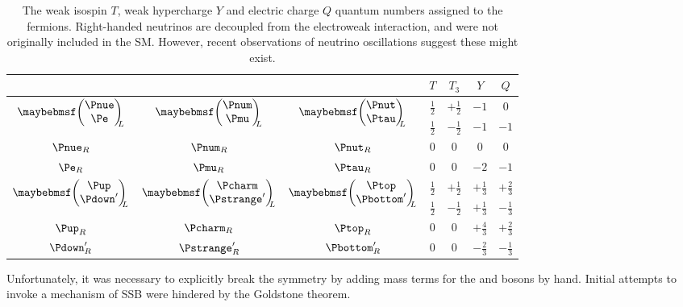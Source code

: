 \begin{table}[b]
	\begin{tabular}{ccc@{\hskip 1cm}cccc}
		& & & $T$ & $T_3$ & $Y$ & $Q$ \\
		\hline
		\multirow{2}{*}{$\colvector{\Pnue\\ \Pe}_{\!\!\!L}$} & 
		\multirow{2}{*}{$\colvector{\Pnum\\ \Pmu}_{\!\!\!L}$} & 
		\multirow{2}{*}{$\colvector{\Pnut\\ \Ptau}_{\!\!\!L}$} & 
		$\tfrac{1}{2}$ & $+\tfrac{1}{2}$ & $-1$ & 0 \\
		& & & $\tfrac{1}{2}$ & $-\tfrac{1}{2}$ & $-1$ & $-1$ \\
		$\Pnue_R$ & $\Pnum_R$ & $\Pnut_R$ & 0 & 0 & 0 & 0 \\
		$\Pe_R$ & $\Pmu_R$ & $\Ptau_R$ & 0 & 0 & $-2$ & $-1$ \\
		\hline
		\multirow{2}{*}{$\colvector{\Pup\\ \Pdown'}_{\!\!\!L}$} & 
		\multirow{2}{*}{$\colvector{\Pcharm\\ \Pstrange'}_{\!\!\!L}$} & 
		\multirow{2}{*}{$\colvector{\Ptop\\ \Pbottom'}_{\!\!\!L}$} & 
		$\tfrac{1}{2}$ & $+\tfrac{1}{2}$ & $+\tfrac{1}{3}$ & $+\tfrac{2}{3}$ \\
		& & & $\tfrac{1}{2}$ & $-\tfrac{1}{2}$ & $+\tfrac{1}{3}$ & $-\tfrac{1}{3}$ \\
		$\Pup_R$ & $\Pcharm_R$ & $\Ptop_R$ & 0 & 0 & $+\tfrac{4}{3}$ & $+\tfrac{2}{3}$ \\
		$\Pdown'_R$ & $\Pstrange'_R$ & $\Pbottom'_R$ & 0 & 0 & $-\tfrac{2}{3}$ & $-\tfrac{1}{3}$ \\
	\end{tabular}
	\caption{The weak isospin $T$, weak hypercharge $Y$ and electric charge $Q$ quantum
	numbers assigned to the fermions. Right-handed neutrinos are decoupled from the 
	electroweak interaction, and were not originally included in the \ac{SM}. However, 
	recent observations of neutrino oscillations suggest these might exist.}
	\label{tab:ew_fermions}
\end{table}

Unfortunately, it was necessary to explicitly break the symmetry by adding mass terms for 
the \PWpm and \PZ bosons by hand. Initial attempts to invoke a mechanism of \ac{SSB} were 
hindered by the Goldstone theorem.



